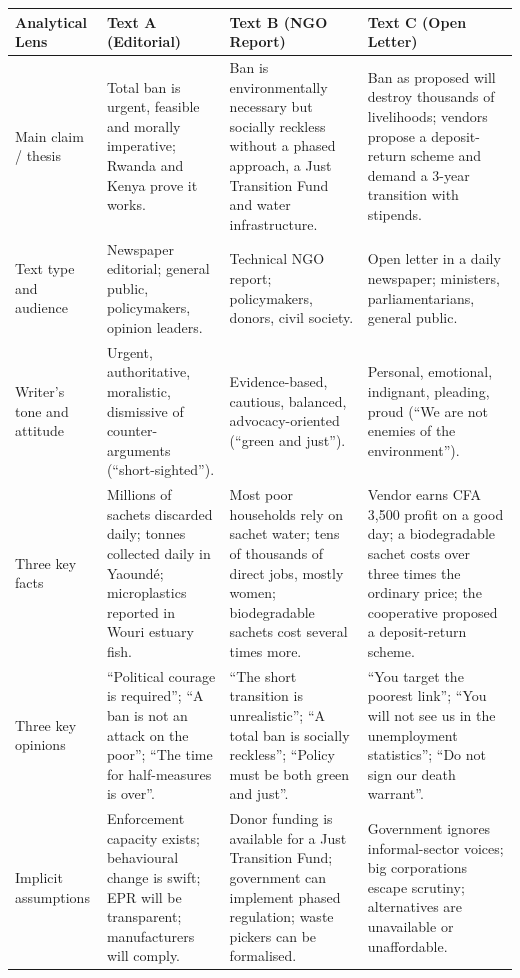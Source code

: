 \documentclass[11pt]{article}
\begin{document}
\begin{center}
\begin{tabularx}{\linewidth}{|l|X|X|X|}\hline
\rowcolor{popblueL}
\textbf{Analytical Lens} & \textbf{Text A (Editorial)} & \textbf{Text B (NGO Report)} & \textbf{Text C (Open Letter)} \\ \hline
Main claim / thesis & Total ban is urgent, feasible and morally imperative; Rwanda and Kenya prove it works. & Ban is environmentally necessary but socially reckless without a phased approach, a Just Transition Fund and water infrastructure. & Ban as proposed will destroy thousands of livelihoods; vendors propose a deposit-return scheme and demand a 3-year transition with stipends. \\ \hline
Text type and audience & Newspaper editorial; general public, policymakers, opinion leaders. & Technical NGO report; policymakers, donors, civil society. & Open letter in a daily newspaper; ministers, parliamentarians, general public. \\ \hline
Writer's tone and attitude & Urgent, authoritative, moralistic, dismissive of counter-arguments (``short-sighted''). & Evidence-based, cautious, balanced, advocacy-oriented (``green and just''). & Personal, emotional, indignant, pleading, proud (``We are not enemies of the environment''). \\ \hline
Three key facts & Millions of sachets discarded daily; tonnes collected daily in Yaoundé; microplastics reported in Wouri estuary fish. & Most poor households rely on sachet water; tens of thousands of direct jobs, mostly women; biodegradable sachets cost several times more. & Vendor earns CFA 3,500 profit on a good day; a biodegradable sachet costs over three times the ordinary price; the cooperative proposed a deposit-return scheme. \\ \hline
Three key opinions & ``Political courage is required''; ``A ban is not an attack on the poor''; ``The time for half-measures is over''. & ``The short transition is unrealistic''; ``A total ban is socially reckless''; ``Policy must be both green and just''. & ``You target the poorest link''; ``You will not see us in the unemployment statistics''; ``Do not sign our death warrant''. \\ \hline
Implicit assumptions & Enforcement capacity exists; behavioural change is swift; EPR will be transparent; manufacturers will comply. & Donor funding is available for a Just Transition Fund; government can implement phased regulation; waste pickers can be formalised. & Government ignores informal-sector voices; big corporations escape scrutiny; alternatives are unavailable or unaffordable. \\ \hline

\end{tabularx}
\end{center}
\end{document}
